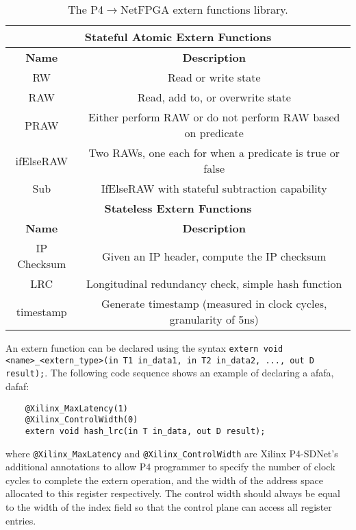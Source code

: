 \begin{table}[!ht]
	\begin{center}
		\caption{The P4$\rightarrow$NetFPGA extern functions library.}
		\label{externs}
		\begin{tabular}{ | c | c | }
			\hline
			\multicolumn{2}{|c|}{\textbf{Stateful Atomic Extern Functions}} \\ \hline
			\textbf{Name} & \textbf{Description}  \\ \hline
			RW & Read or write state \\ \hline
			RAW & Read, add to, or overwrite state  \\ \hline
			PRAW & Either perform RAW or do not perform RAW based on predicate \\ \hline
			ifElseRAW & Two RAWs, one each for when a predicate is true or false \\ \hline
			Sub & IfElseRAW with stateful subtraction capability \\ \hline
			
			\multicolumn{2}{|c|}{\textbf{Stateless Extern Functions}} \\ \hline
			\textbf{Name} & \textbf{Description}  \\ \hline
			IP Checksum & Given an IP header, compute the IP checksum \\ \hline
			LRC & Longitudinal redundancy check, simple hash function \\ \hline
			timestamp & Generate timestamp (measured in clock cycles, granularity of 5ns) \\ \hline
		\end{tabular}
	\end{center}
\end{table}

An extern function can be declared using the syntax \verb|extern void <name>_<extern_type>(in T1 in_data1, in T2 in_data2, ..., out D result);|. The following code sequence shows an example of declaring a afafa, dafaf:

{\renewcommand{\baselinestretch}{0.8}\small
	\begin{verbatim}
	@Xilinx_MaxLatency(1)
	@Xilinx_ControlWidth(0)
	extern void hash_lrc(in T in_data, out D result);
	\end{verbatim}
}
where \texttt{@Xilinx\_MaxLatency} and \texttt{@Xilinx\_ControlWidth} are Xilinx P4-SDNet's additional annotations to allow P4 programmer to specify the number of clock cycles to complete the extern operation, and the width of the address space allocated to this register respectively. The control width should always be equal to the width of the index field so that the control plane can access all register entries.

